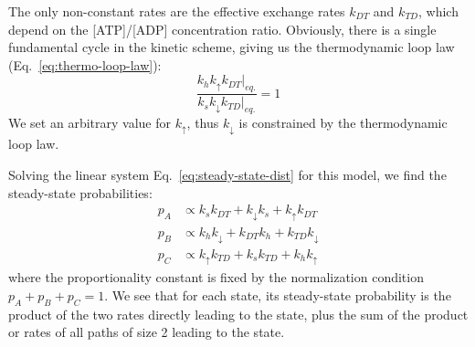     The only non-constant rates are the effective exchange rates $k_{DT}$ and $k_{TD}$, which depend on the [ATP]/[ADP] concentration ratio. Obviously, there is a single fundamental cycle in the kinetic scheme, giving us the thermodynamic loop law (Eq.~\eqref{eq:thermo-loop-law}):
    \begin{equation}
    \label{eq:sc2r-thermo-loop-law}
        \frac{k_h k_\uparrow \left.k_{DT}\right|_{eq.}}{k_s k_\downarrow \left.k_{TD}\right|_{eq.}} = 1
    \end{equation}
    We set an arbitrary value for $k_\uparrow$, thus $k_\downarrow$ is constrained by the thermodynamic loop law. 
    
    Solving the linear system Eq.~\eqref{eq:steady-state-dist} for this model, we find the steady-state probabilities:
    \begin{equation}
    \label{eq:sc2r-steady-state-probabilities}
    \begin{split}
        p_A &\propto k_s k_{DT} + k_\downarrow k_s + k_\uparrow k_{DT} \\
        p_B &\propto k_h k_\downarrow + k_{DT} k_h + k_{TD} k_\downarrow \\
        p_C &\propto k_\uparrow k_{TD} + k_s k_{TD} + k_h k_\uparrow
    \end{split}
    \end{equation}
    where the proportionality constant is fixed by the normalization condition $p_A+p_B+p_C=1$. We see that for each state, its steady-state probability is the product of the two rates directly leading to the state, plus the sum of the product or rates of all paths of size 2 leading to the state.
    
